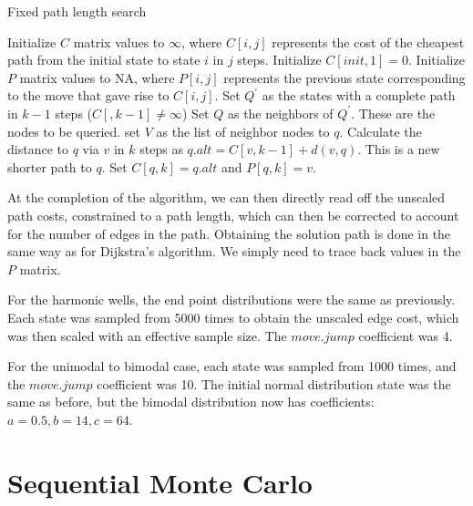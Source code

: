 \begin{algorithm}
\caption{Fixed path length search}
\begin{algorithmic}[1]
    \STATE Initialize $C$ matrix values to $\infty$, where $C[i,j]$ represents the cost of the cheapest path from the initial state to state $i$ in $j$ steps.
    \STATE Initialize $C[init,1]=0$.
    \STATE Initialize $P$ matrix values to NA, where $P[i,j]$ represents the previous state corresponding to the move that gave rise to $C[i,j]$.
        \STATE Set $Q^\prime$ as the states with a complete path in $k-1$ steps ($C[,k-1]\neq \infty$)
        \STATE Set $Q$ as the neighbors of $Q^\prime$. These are the nodes to be queried.
            \STATE set $V$ as the list of neighbor nodes to $q$.
                \STATE Calculate the distance to $q$ via $v$ in $k$ steps as $q.alt = C[v,k-1] + d(v,q)$.
                    \STATE This is a new shorter path to $q$.
                    \STATE Set $C[q,k] = q.alt$ and $P[q,k] = v$.
                \ENDIF
            \ENDFOR
        \ENDFOR
    \ENDFOR
\end{algorithmic}
\end{algorithm}

At the completion of the algorithm, we can then directly read off the unscaled path costs, constrained to a path length, which can then be corrected to account for the number of edges in the path.
Obtaining the solution path is done in the same way as for Dijkstra's algorithm. 
We simply need to trace back values in the $P$ matrix.

For the harmonic wells, the end point distributions were the same as previously. Each state was sampled from 5000 times to obtain the unscaled edge cost, which was then scaled with an effective sample size. The $move.jump$ coefficient was 4.

For the unimodal to bimodal case, each state was sampled from 1000 times, and the $move.jump$ coefficient was 10. The initial normal distribution state was the same as before, but the bimodal distribution now has coefficients: $a=0.5, b=14, c=64$.

\section{Sequential Monte Carlo} %
\label{sec:sequential_monte_carlo}

